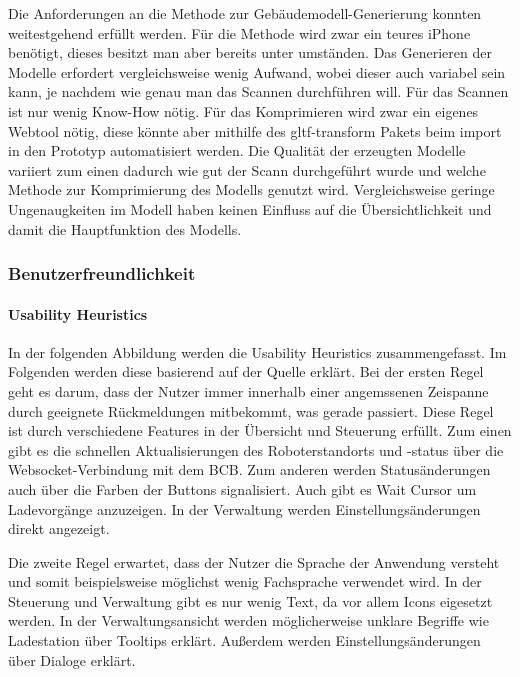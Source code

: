Die Anforderungen an die Methode zur Gebäudemodell-Generierung konnten weitestgehend erfüllt werden. Für die Methode wird zwar ein teures iPhone benötigt, dieses besitzt man aber bereits unter umständen. Das Generieren der Modelle erfordert vergleichsweise wenig Aufwand, wobei dieser auch variabel sein kann, je nachdem wie genau man das Scannen durchführen will. Für das Scannen ist nur wenig Know-How nötig. Für das Komprimieren wird zwar ein eigenes Webtool nötig, diese könnte aber mithilfe des gltf-transform Pakets beim import in den Prototyp automatisiert werden.
Die Qualität der erzeugten Modelle variiert zum einen dadurch wie gut der Scann durchgeführt wurde und welche Methode zur Komprimierung des Modells genutzt wird. Vergleichsweise geringe Ungenaugkeiten im Modell haben keinen Einfluss auf die Übersichtlichkeit und damit die Hauptfunktion des Modells. 

\subsubsection{Benutzerfreundlichkeit}

\paragraph{Usability Heuristics}\label{sec:UsabilityHeuristics}
In der folgenden Abbildung werden die Usability Heuristics zusammengefasst. Im Folgenden werden diese basierend auf der Quelle erklärt.
Bei der ersten Regel geht es darum, dass der Nutzer immer innerhalb einer angemssenen Zeispanne durch geeignete Rückmeldungen mitbekommt, was gerade passiert. Diese Regel ist durch verschiedene Features in der Übersicht und Steuerung erfüllt. Zum einen gibt es die schnellen Aktualisierungen des Roboterstandorts und -status über die \gls{Websocket}-Verbindung mit dem \ac{BCB}. Zum anderen werden Statusänderungen auch über die Farben der Buttons signalisiert. Auch gibt es Wait Cursor um Ladevorgänge anzuzeigen. In der Verwaltung werden Einstellungsänderungen direkt angezeigt.

Die zweite Regel erwartet, dass der Nutzer die Sprache der Anwendung versteht und somit beispielsweise möglichst wenig Fachsprache verwendet wird. In der Steuerung und Verwaltung gibt es nur wenig Text, da vor allem Icons eigesetzt werden. In der Verwaltungsansicht werden möglicherweise unklare Begriffe wie Ladestation über Tooltips erklärt. Außerdem werden Einstellungsänderungen über Dialoge erklärt.

